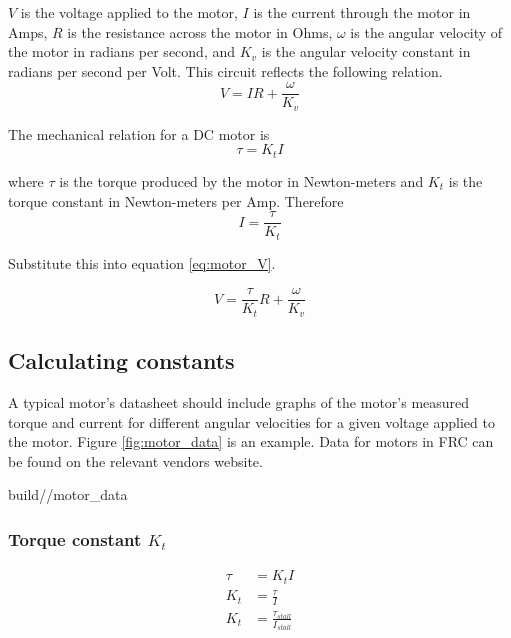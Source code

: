 $V$ is the voltage applied to the motor, $I$ is the current through the motor in
Amps, $R$ is the resistance across the motor in Ohms, $\omega$ is the angular
velocity of the motor in radians per second, and $K_v$ is the angular velocity
constant in radians per second per Volt. This circuit reflects the following
relation.
\begin{equation}
  V = IR + \frac{\omega}{K_v} \label{eq:motor_V}
\end{equation}

The mechanical relation for a DC motor is
\begin{equation}
  \tau = K_t I
\end{equation}

where $\tau$ is the torque produced by the motor in Newton-meters and $K_t$ is
the torque constant in Newton-meters per Amp. Therefore
\begin{equation*}
  I = \frac{\tau}{K_t}
\end{equation*}

Substitute this into equation \eqref{eq:motor_V}.

\begin{equation}
  V = \frac{\tau}{K_t} R + \frac{\omega}{K_v} \label{eq:motor_tau_V}
\end{equation}

\subsection{Calculating constants}

A typical motor's datasheet should include graphs of the motor's measured torque
and current for different angular velocities for a given voltage applied to the
motor. Figure \ref{fig:motor_data} is an example. Data for motors in FRC can be
found on the relevant vendors website.
\begin{svg}{build/\chapterpath/motor_data}
  \caption{Example motor datasheet for 775pro}
  \label{fig:motor_data}
\end{svg}

\subsubsection{Torque constant $K_t$}
\begin{align}
  \tau &= K_t I \nonumber \\
  K_t &= \frac{\tau}{I} \nonumber \\
  K_t &= \frac{\tau_{stall}}{I_{stall}}
\end{align}

